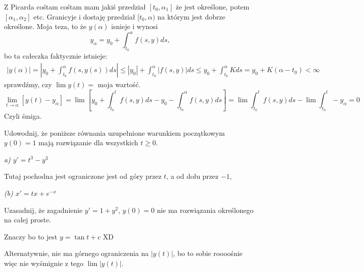 \documentclass{article}
\begin{document}
Z Picarda cośtam cośtam mam jakiś przedział $[t_0, \alpha_1]$ że jest określone, potem $[\alpha_1,\alpha_2]$ etc. Granicyje i dostaję przedział $[t_0,\alpha)$ na którym jest dobrze określone. Moja teza, to że $y(\alpha)$ isnieje i wynosi
$$y_\alpha=y_0+\int_{t_0}^\alpha f(s,y)ds,$$
bo ta całeczka faktycznie istnieje:
\begin{align*}
    |y(\alpha)|=\left|y_0+\int_{t_0}^\alpha f(s, y(s))ds\right|\leq |y_0|+\int_{t_0}^\alpha|f(s,y)|ds\leq y_0+\int_{t_0}^\alpha Kds=y_0+K(\alpha-t_0)<\infty
\end{align*}
sprawdźmy, czy $\lim y(t)=$ moja wartość.
$$\lim_{t\to\alpha}\left[y(t)-y_\alpha\right]=\lim\left[y_0+\int_{t_0}^tf(s,y)ds-y_0-\int_{t_0}^\alpha f(s, y)ds\right]=\lim\int_{t_0}^t f(s,y)ds-\lim\int_{t_0}^t-y_\alpha=0$$
Czyli śmiga.

\begin{problem}{}
Udowodnij, że poniższe równania uzupełnione warunkiem początkowym $y(0)=1$ mają rozwiązanie dla wszystkich $t\geq0$.
\end{problem}

\emph{\color{green}a) $y'=t^3-y^3$}

Tutaj pochodna jest ograniczone jest od góry przez $t$, a od dołu przez $-1$,



\emph{\color{green}(b) $x'=tx+e^{-x}$}

\begin{problem}{}
Uzasadnij, że zagadnienie $y'=1+y^2$, $y(0)=0$ nie ma rozwiązania określonego na całej proste.
\end{problem}

Znaczy bo to jest $y=\tan{t+c}$ XD

Alternatywnie, nie ma górnego ograniczenia na $|y(t)|$, bo to sobie roooośnie więc nie wyśmignie z tego $\lim|y(t)|$.
\end{document}
